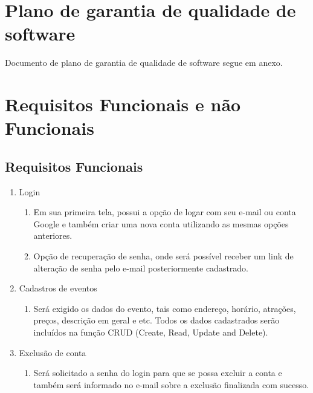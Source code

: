 \documentclass[12pt]{article}
\begin{document}
    \section{Plano de garantia de qualidade de software}
        Documento de plano de garantia de qualidade de software segue em anexo.
    \section{Requisitos Funcionais e não Funcionais}
        \subsection{Requisitos Funcionais}
        \begin{enumerate}
            \item Login
                \begin{enumerate}
                    \item Em sua primeira tela, possui a opção de logar com seu e-mail ou conta Google e também criar uma nova conta utilizando as mesmas opções anteriores.
                    \item 	Opção de recuperação de senha, onde será possível receber um link de alteração de senha pelo e-mail posteriormente cadastrado.
                \end{enumerate}
            \item Cadastros de eventos
                \begin{enumerate}
                    \item Será exigido os dados do evento, tais como endereço, horário, atrações, preços, descrição em geral e etc. Todos os dados cadastrados serão incluídos na função CRUD (Create, Read, Update and Delete).
                \end{enumerate}
            \item Exclusão de conta
                \begin{enumerate}
                    \item Será solicitado a senha do login para que se possa excluir a conta e também será informado no e-mail sobre a exclusão finalizada com sucesso.
                \end{enumerate}
        \end{enumerate}
\end{document}
